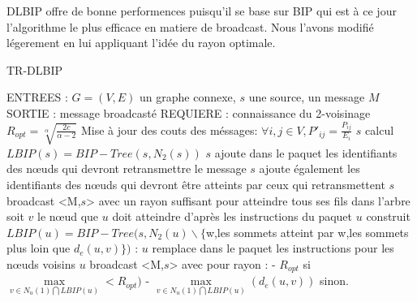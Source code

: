 DLBIP offre de bonne performences puisqu'il se base sur BIP qui est à ce jour l'algorithme le plus efficace en matiere de broadcast.
Nous l'avons modifié légerement en lui appliquant l'idée du rayon optimale.

\begin{algorithm}[H]
\caption{TR-DLBIP}
\label{algo_TRDLBIP}
\begin{algorithmic}
\STATE ENTREES : $G=(V,E)$ un graphe connexe, $s$ une source, un message $M$
\STATE SORTIE : message broadcasté
\STATE REQUIERE : connaissance du 2-voisinage
\STATE $R_{opt}=\sqrt[\alpha]{\frac{2c}{\alpha-2}}$
\STATE Mise à jour des couts des méssages: $ \forall i,j \in V, P'_{ij}=\frac{P_{ij}}{E_i}$
\STATE $s$ calcul $LBIP(s)=BIP-Tree(s,N_2(s))$
\STATE $s$ ajoute dans le paquet les identifiants des nœuds qui devront retransmettre le message
\STATE $s$ ajoute également les identifiants des nœuds qui devront être atteints par ceux qui retransmettent
\STATE $s$ broadcast <M,$s$> avec un rayon suffisant pour atteindre tous ses fils dans l'arbre
		\STATE soit $v$ le nœud que $u$ doit atteindre d'après les instructions du paquet
		\STATE $u$ construit $LBIP(u)=BIP-Tree(s,N_2(u)\backslash \{$w,les sommets atteint par w,les sommets plus loin que $d_e(u,v)\})$ :
			\INDSTATE $u$ remplace dans le paquet les instructions pour les nœuds voisins
			\INDSTATE $u$ broadcast <M,$s$> avec pour rayon : 
			      \INDSTATE[2] - $R_{opt}$ si $\max\limits_{v\in N_u(1)\bigcap LBIP(u)}< R_{opt})$
			      \INDSTATE[2] - $\max\limits_{v\in N_u(1)\bigcap LBIP(u)}(d_e(u,v))$ sinon.
	\ENDIF
\ENDIF
\end{algorithmic}
\end{algorithm}
















